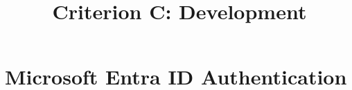

\usepackage{xr}


\title{Criterion C: Development}


\maketitle

\tableofcontents

\section{Microsoft Entra ID Authentication}


\printbibliography


